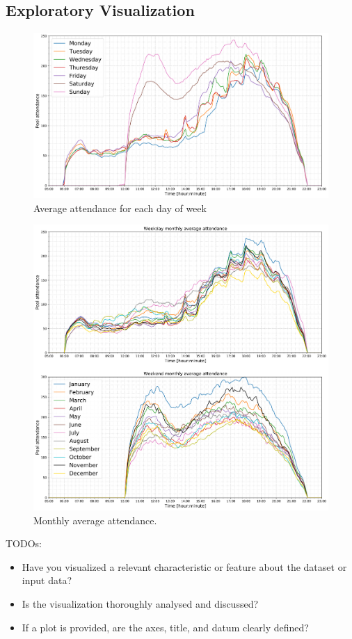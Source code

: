 \documentclass{article}
\begin{document}
\subsection{Exploratory Visualization}
\begin{figure}[h!]
\centering
\includegraphics[width=12cm]{imgs/averages}
\caption{Average attendance for each day of week}
\label{fig:averages}
\end{figure}

\begin{figure}[h!]
\centering
\includegraphics[width=12cm]{imgs/monthly_averages_together.png}
\caption{Monthly average attendance.}
\label{fig:monthly_averages}
\end{figure}

\color{red}
TODOs:
\begin{itemize}
    \item Have you visualized a relevant characteristic or feature about the dataset or input data?
    \item Is the visualization thoroughly analysed and discussed?
    \item If a plot is provided, are the axes, title, and datum clearly defined?
\end{itemize}
\color{black}   
\end{document}
